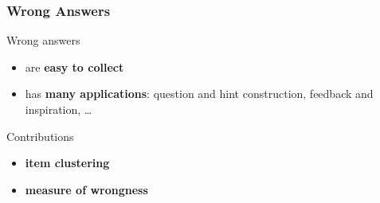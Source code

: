 \documentclass[xcolor=svgnames]{beamer}
\begin{document}
\begin{frame}
    \frametitle{Wrong Answers}
    \huge
    Wrong answers
    \Large
    \begin{itemize}
        \item are \textbf{easy to collect}
        \item has \textbf{many applications}: question and hint construction, feedback and inspiration, \dots
    \end{itemize}
    Contributions
    \begin{itemize}
        \item \textbf{item clustering}
        \item \textbf{measure of wrongness}
    \end{itemize}
\end{frame}
\end{document}
